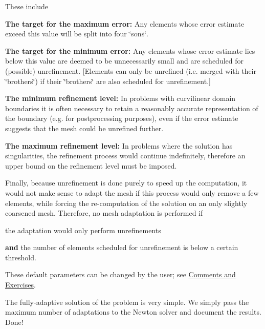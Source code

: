 These include
\begin{DoxyItemize}
\item {\bfseries The target for the maximum error\+:} Any elements whose error estimate exceed this value will be split into four \char`\"{}sons\char`\"{}.
\item {\bfseries The target for the minimum error\+: } Any elements whose error estimate lies below this value are deemed to be unnecessarily small and are scheduled for (possible) unrefinement. \mbox{[}Elements can only be unrefined (i.\+e. merged with their \char`\"{}brothers\char`\"{}) if their \char`\"{}brothers\char`\"{} are also scheduled for unrefinement.\mbox{]}
\item {\bfseries The minimum refinement level\+:} In problems with curvilinear domain boundaries it is often necessary to retain a reasonably accurate representation of the boundary (e.\+g. for postprocessing purposes), even if the error estimate suggests that the mesh could be unrefined further.
\item {\bfseries The maximum refinement level\+:} In problems where the solution has singularities, the refinement process would continue indefinitely, therefore an upper bound on the refinement level must be imposed.
\item Finally, because unrefinement is done purely to speed up the computation, it would not make sense to adapt the mesh if this process would only remove a few elements, while forcing the re-\/computation of the solution on an only slightly coarsened mesh. Therefore, no mesh adaptation is performed if
\begin{DoxyItemize}
\item the adaptation would only perform unrefinements
\item {\bfseries and} the number of elements scheduled for unrefinement is below a certain threshold.
\end{DoxyItemize}
\end{DoxyItemize}These default parameters can be changed by the user; see \hyperlink{index_comments}{Comments and Exercises}.

The fully-\/adaptive solution of the problem is very simple. We simply pass the maximum number of adaptations to the Newton solver and document the results. Done!

